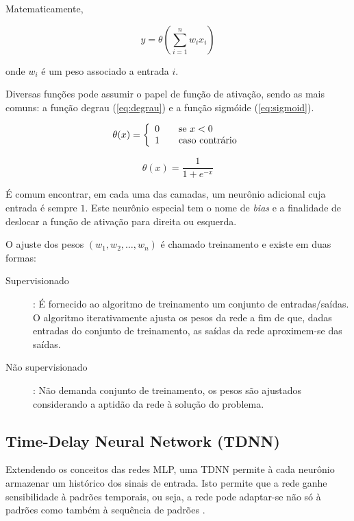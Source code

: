 Matematicamente,

\[ y = \theta ( \sum_{i=1}^{n} w_i x_i ) \]

onde \(w_i\) é um peso associado a entrada \(i\).

Diversas funções pode assumir o papel de função de ativação, sendo as mais comuns:
a função degrau (\ref{eq:degrau}) e a função sigmóide (\ref{eq:sigmoid}).

\begin{equation} \label{eq:degrau}
    \theta(x) = \left\{
    \begin{array}{l l}
        0 & \quad \text{se } x < 0\\
        1 & \quad \text{caso contrário}
    \end{array} \right.
\end{equation}

\begin{equation} \label{eq:sigmoid}
    \theta(x) = \frac{1}{1 + e^{-x}}
\end{equation}

É comum encontrar, em cada uma das camadas, um neurônio adicional cuja entrada é sempre \(1\). Este neurônio especial tem o nome de \textit{bias} e a finalidade de deslocar a função de ativação para direita ou esquerda.

O ajuste dos pesos \((w_1, w_2, \dots , w_n)\) é chamado treinamento e existe em duas formas:

\begin{description}
    \item[Supervisionado]: É fornecido ao algoritmo de treinamento um conjunto de entradas/saídas. O algoritmo iterativamente ajusta os pesos da rede a fim de que, dadas entradas do conjunto de treinamento, as saídas da rede aproximem-se das saídas.
    \item[Não supervisionado]: Não demanda conjunto de treinamento, os pesos
são ajustados considerando a aptidão da rede à solução do problema.
\end{description}

\subsection{Time-Delay Neural Network (TDNN)}

Extendendo os conceitos das redes MLP, uma TDNN permite à cada neurônio armazenar um
histórico dos sinais de entrada. Isto permite que a rede ganhe sensibilidade à padrões temporais, ou seja, a rede pode adaptar-se não só à padrões como também à sequência de padrões \cite{kaiser94tdnn}.

